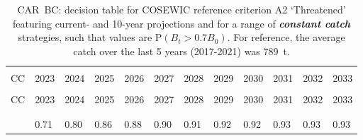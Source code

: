\documentclass[11pt]{book}
\newcommand{\itbf}[1]{\textit{\textbf{#1}}}
\begin{document}
\begin{longtable}[c]{>{\raggedright\let\newline\\\arraybackslash\hspace{0pt}}p{0.52in}>{\raggedleft\let\newline\\\arraybackslash\hspace{0pt}}p{0.52in}>{\raggedleft\let\newline\\\arraybackslash\hspace{0pt}}p{0.52in}>{\raggedleft\let\newline\\\arraybackslash\hspace{0pt}}p{0.52in}>{\raggedleft\let\newline\\\arraybackslash\hspace{0pt}}p{0.52in}>{\raggedleft\let\newline\\\arraybackslash\hspace{0pt}}p{0.52in}>{\raggedleft\let\newline\\\arraybackslash\hspace{0pt}}p{0.52in}>{\raggedleft\let\newline\\\arraybackslash\hspace{0pt}}p{0.52in}>{\raggedleft\let\newline\\\arraybackslash\hspace{0pt}}p{0.52in}>{\raggedleft\let\newline\\\arraybackslash\hspace{0pt}}p{0.52in}>{\raggedleft\let\newline\\\arraybackslash\hspace{0pt}}p{0.52in}>{\raggedleft\let\newline\\\arraybackslash\hspace{0pt}}p{0.52in}}
  \caption{CAR~BC: decision table for COSEWIC reference criterion A2 `Threatened' featuring current- and 10-year projections and for a range of \itbf{constant catch} strategies, such that values are P$(B_t > 0.7 B_0)$. For reference, the average catch over the last 5 years (2017-2021) was 789~t. } \label{tab:car.cosewic.70B0.CCs}\\  \hline\\[-2.2ex]  CC  & 2023 & 2024 & 2025 & 2026 & 2027 & 2028 & 2029 & 2030 & 2031 & 2032 & 2033 \\[0.2ex]\hline\\[-1.5ex]  \endfirsthead   \hline  CC  & 2023 & 2024 & 2025 & 2026 & 2027 & 2028 & 2029 & 2030 & 2031 & 2032 & 2033 \\[0.2ex]\hline\\[-1.5ex]  \endhead  \hline\\[-2.2ex]   \endfoot  \hline \endlastfoot  0 & 0.71 & 0.80 & 0.86 & 0.88 & 0.90 & 0.91 & 0.92 & 0.92 & 0.93 & 0.93 & 0.93 \\ 

\end{longtable}
\end{document}
